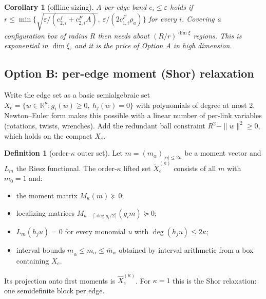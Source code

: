 \documentclass[11pt]{article}
\newcommand{\R}{\mathbb{R}}
\theoremstyle{plain}
\newtheorem{corollary}[theorem]{Corollary}
\theoremstyle{definition}
\newtheorem{definition}[theorem]{Definition}
\theoremstyle{remark}
\begin{document}
\begin{corollary}[offline sizing]\label{cor:sizing}
A per-edge band $e_i\le\varepsilon$ holds if $r\le\min\{\sqrt{\varepsilon/(c^f_{2,i}+c^F_{2,i}A)},\ \varepsilon/(2c^F_{1,i}\rho_a)\}$ for every $i$. Covering a configuration box of radius $R$ then needs about $(R/r)^{\dim\xi}$ regions. This is exponential in $\dim\xi$, and it is the price of Option A in high dimension.
\end{corollary}

\subsection{Option B: per-edge moment (Shor) relaxation}\label{sec:optB}
Write the edge set as a basic semialgebraic set $X_e=\{w\in\R^n: g_i(w)\ge0,\ h_j(w)=0\}$ with polynomials of degree at most 2. Newton--Euler form makes this possible with a linear number of per-link variables (rotations, twists, wrenches). Add the redundant ball constraint $R^2-\|w\|^2\ge0$, which holds on the compact $X_e$.

\begin{definition}[order-$\kappa$ outer set]\label{def:moment}
Let $m=(m_\alpha)_{|\alpha|\le2\kappa}$ be a moment vector and $L_m$ the Riesz functional. The order-$\kappa$ lifted set $\tilde X_e^{(\kappa)}$ consists of all $m$ with $m_0=1$ and:
\begin{itemize}[leftmargin=1.2em]
  \item the moment matrix $M_\kappa(m)\succeq0$;
  \item localizing matrices $M_{\kappa-\lceil\deg g_i/2\rceil}(g_im)\succeq0$;
  \item $L_m(h_ju)=0$ for every monomial $u$ with $\deg(h_ju)\le2\kappa$;
  \item interval bounds $\underline m_\alpha\le m_\alpha\le\overline m_\alpha$ obtained by interval arithmetic from a box containing $X_e$.
\end{itemize}
Its projection onto first moments is $\hat X_e^{(\kappa)}$. For $\kappa=1$ this is the Shor relaxation: one semidefinite block per edge.
\end{definition}
\end{document}

